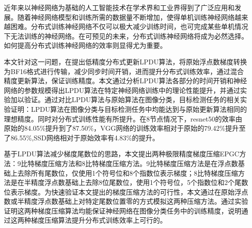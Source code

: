 \begin{cabstract}
近年来以神经网络为基础的人工智能技术在学术界和工业界得到了广泛应用和发展。随着神经网络模型和训练所需的数据量不断增加，使得单机训练神经网络越来越困难。分布式训练神经网络不仅可以极大减少训练时间，也可完成某些单机情况下无法训练的神经网络。在可预见的未来，分布式训练神经网络将成为必然选择。如何提高分布式训练神经网络的效率则显得尤为重要。

本文针对这一问题，在提出低精度分布式更新LPDU算法，将原始浮点数梯度转换为BF16格式进行传输，减少同步时间开销，进而提升分布式训练效率，通过混合精度更新算法，保证训练精度。本文通过分析LPDU算法各部分的时间开销和神经网络的参数规模得出LPDU算法在特定神经网络训练中的理论性能提升，并通过实验加以验证。通过对比LPDU算法与原始算法在图像分类，目标检测任务的相关实验证明：LPDU算法在图像分类与目标检测任务中均能达到与原始更新算法相同的理想精度。同时对分布式训练性能有所提升。在8节点情况下，resnet50的效率由原始的84.05\%提升到了87.50\%，VGG网络的训练效率相对于原始的79.42\%提升至了86.55\%,SSD网络相对于原始效率有4.83\%的提升。

基于LPDU算法减少梯度尾数位的思路，本文提出两种极限精度梯度压缩EPGC方法：9比特梯度压缩方法和8比特梯度压缩方法。9比特梯度压缩方法是在浮点数基础上去除所有尾数位，仅使用1个符号位和8个指数位表示梯度；8比特梯度压缩方法是在半精度浮点数基础上去除8位尾数位，使用1个符号位，5个指数位和2个尾数位表示梯度。为快速验证本文提出的梯度压缩方法的可行性，本文通过在原始浮点数或半精度浮点数基础上对特定尾数位置零的方式模拟这两种压缩方法。通过实验证明这两种梯度压缩算法均能保证神经网络在图像分类任务中的训练精度，说明通过这两种梯度压缩算法提升分布式训练效率上可行的。

\end{cabstract}

